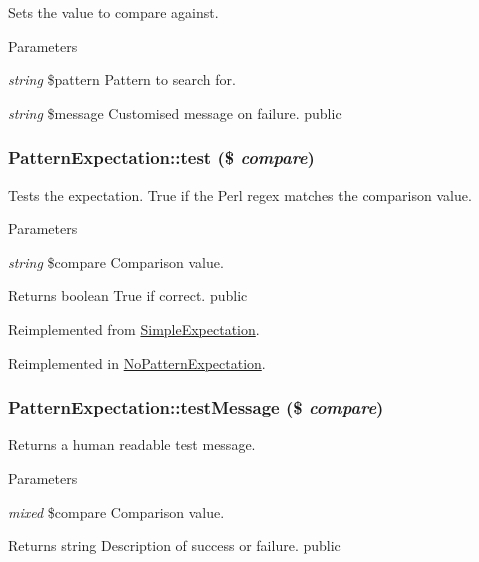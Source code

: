 \label{class_pattern_expectation_a870ee69338895ba6f682be2f9889427a}
Sets the value to compare against. 
\begin{DoxyParams}{Parameters}
\item[{\em string}]\$pattern Pattern to search for. \item[{\em string}]\$message Customised message on failure.  public \end{DoxyParams}
\hypertarget{class_pattern_expectation_a672fecfc691c4c115d4f4d37c365dae5}{
\subsubsection[{test}]{\setlength{\rightskip}{0pt plus 5cm}PatternExpectation::test (\$ {\em compare})}}
\label{class_pattern_expectation_a672fecfc691c4c115d4f4d37c365dae5}
Tests the expectation. True if the Perl regex matches the comparison value. 
\begin{DoxyParams}{Parameters}
\item[{\em string}]\$compare Comparison value. \end{DoxyParams}
\begin{DoxyReturn}{Returns}
boolean True if correct.  public 
\end{DoxyReturn}


Reimplemented from \hyperlink{class_simple_expectation_aa2b98f827e7487ebe12cedb9ad39d061}{SimpleExpectation}.

Reimplemented in \hyperlink{class_no_pattern_expectation_adea22650021fb33f1d745aba552e6971}{NoPatternExpectation}.\hypertarget{class_pattern_expectation_a7adc09e88f1abac0401d807e7f4763c8}{
\subsubsection[{testMessage}]{\setlength{\rightskip}{0pt plus 5cm}PatternExpectation::testMessage (\$ {\em compare})}}
\label{class_pattern_expectation_a7adc09e88f1abac0401d807e7f4763c8}
Returns a human readable test message. 
\begin{DoxyParams}{Parameters}
\item[{\em mixed}]\$compare Comparison value. \end{DoxyParams}
\begin{DoxyReturn}{Returns}
string Description of success or failure.  public 
\end{DoxyReturn}


